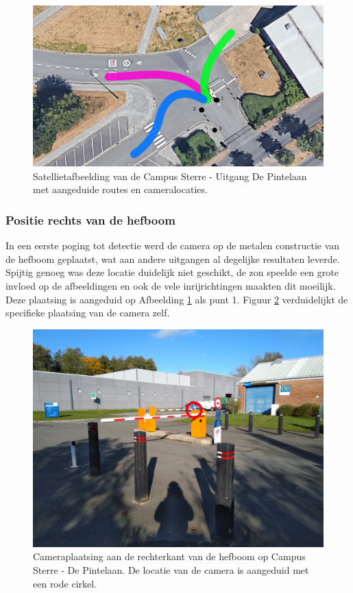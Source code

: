 \begin{figure}[h!]
	\centering
	\includegraphics[width=\linewidth]{img/satellietdepintelaan.png}
	\caption{Satellietafbeelding van de Campus Sterre - Uitgang De Pintelaan met aangeduide routes en cameralocaties. \autocite{ugent2019google}}
	\label{fig:satellietdepintelaan}
\end{figure}

\subsubsection{Positie rechts van de hefboom}
In een eerste poging tot detectie werd de camera op de metalen constructie van de hefboom geplaatst, wat aan andere uitgangen al degelijke resultaten leverde. Spijtig genoeg was deze locatie duidelijk niet geschikt, de zon speelde een grote invloed op de afbeeldingen en ook de vele inrijrichtingen maakten dit moeilijk. Deze plaatsing is aangeduid op Afbeelding \ref{fig:satellietdepintelaan} als punt 1. Figuur \ref{fig:plaatsingdepintelaanorigineel} verduidelijkt de specifieke plaatsing van de camera zelf.

\begin{figure}[h!]
	\centering
	\includegraphics[width=0.8\linewidth]{img/depintelaanorigineel.jpg}
	\caption{Cameraplaatsing aan de rechterkant van de hefboom op Campus Sterre - De Pintelaan. De locatie van de camera is aangeduid met een rode cirkel.}
	\label{fig:plaatsingdepintelaanorigineel}
\end{figure}

